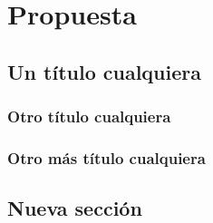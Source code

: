 
\chapter{Propuesta}
\label{ch:propuesta}

\lipsum[1]

\section{Un título cualquiera}

\lipsum[1]

\subsection{Otro título cualquiera}

\lipsum[2-4]

\subsection{Otro más título cualquiera}

\lipsum[5-6]

\section{Nueva sección}

\lipsum[1-3]

